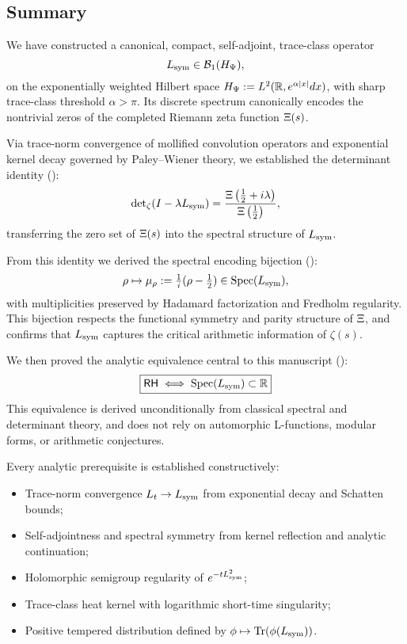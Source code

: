 \subsection*{Summary}

We have constructed a canonical, compact, self-adjoint, trace-class operator
\[
L_{\mathrm{sym}} \in \mathcal{B}_1(H_{\Psi}),
\]
on the exponentially weighted Hilbert space \( H_{\Psi} := L^2(\mathbb{R}, e^{\alpha|x|} dx) \), with sharp trace-class threshold \( \alpha > \pi \). Its discrete spectrum canonically encodes the nontrivial zeros of the completed Riemann zeta function \( \Xi(s) \).

\medskip

\noindent
Via trace-norm convergence of mollified convolution operators and exponential kernel decay governed by Paley–Wiener theory, we established the determinant identity ():
\[
\det\nolimits_{\zeta}(I - \lambda L_{\mathrm{sym}}) = \frac{\Xi\left(\tfrac{1}{2} + i\lambda\right)}{\Xi\left(\tfrac{1}{2}\right)},
\]
transferring the zero set of \( \Xi(s) \) into the spectral structure of \( L_{\mathrm{sym}} \).

\medskip

\noindent
From this identity we derived the spectral encoding bijection ():
\[
\rho \mapsto \mu_\rho := \tfrac{1}{i}(\rho - \tfrac{1}{2}) \in \operatorname{Spec}(L_{\mathrm{sym}}),
\]
with multiplicities preserved by Hadamard factorization and Fredholm regularity. This bijection respects the functional symmetry and parity structure of \( \Xi \), and confirms that \( L_{\mathrm{sym}} \) captures the critical arithmetic information of \( \zeta(s) \).

\medskip

\noindent
We then proved the analytic equivalence central to this manuscript ():
\[
\boxed{
\mathsf{RH} \iff \operatorname{Spec}(L_{\mathrm{sym}}) \subset \mathbb{R}
}
\]
This equivalence is derived unconditionally from classical spectral and determinant theory, and does not rely on automorphic L-functions, modular forms, or arithmetic conjectures.

\medskip

\noindent
Every analytic prerequisite is established constructively:
\begin{itemize}
  \item Trace-norm convergence \( L_t \to L_{\mathrm{sym}} \) from exponential decay and Schatten bounds;
  \item Self-adjointness and spectral symmetry from kernel reflection and analytic continuation;
  \item Holomorphic semigroup regularity of \( e^{-t L_{\mathrm{sym}}^2} \);
  \item Trace-class heat kernel with logarithmic short-time singularity;
  \item Positive tempered distribution defined by \( \phi \mapsto \operatorname{Tr}(\phi(L_{\mathrm{sym}})) \).
\end{itemize}

